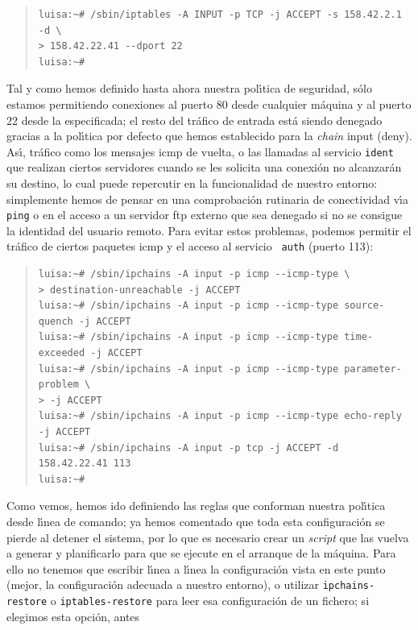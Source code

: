 \begin{quote}
\begin{verbatim}
luisa:~# /sbin/iptables -A INPUT -p TCP -j ACCEPT -s 158.42.2.1 -d \
> 158.42.22.41 --dport 22
luisa:~#
\end{verbatim}
\end{quote}
Tal y como hemos definido hasta ahora nuestra pol\'{\i}tica de seguridad, s\'olo
estamos permitiendo conexiones al puerto 80 desde cualquier m\'aquina y al
puerto 22 desde la especificada; el resto del tr\'afico de entrada est\'a siendo
denegado gracias a la pol\'{\i}tica por defecto que hemos establecido para la
{\it chain} input ({\sc deny}). As\'{\i}, tr\'afico como los mensajes {\sc 
icmp} de vuelta, o las llamadas al servicio {\tt ident} que realizan ciertos
servidores cuando se les solicita una conexi\'on no alcanzar\'an su destino, lo
cual puede repercutir en la funcionalidad de nuestro entorno: simplemente hemos
de pensar en una comprobaci\'on rutinaria de conectividad v\'{\i}a {\tt ping} o
en el acceso a un servidor {\sc ftp} externo que sea denegado si no se consigue 
la identidad del usuario remoto. Para evitar estos problemas, podemos permitir
el tr\'afico de ciertos paquetes {\sc icmp} y el acceso al servicio {\tt
auth} (puerto 113):
\begin{quote}
\begin{verbatim}
luisa:~# /sbin/ipchains -A input -p icmp --icmp-type \ 
> destination-unreachable -j ACCEPT
luisa:~# /sbin/ipchains -A input -p icmp --icmp-type source-quench -j ACCEPT
luisa:~# /sbin/ipchains -A input -p icmp --icmp-type time-exceeded -j ACCEPT
luisa:~# /sbin/ipchains -A input -p icmp --icmp-type parameter-problem \
> -j ACCEPT
luisa:~# /sbin/ipchains -A input -p icmp --icmp-type echo-reply -j ACCEPT
luisa:~# /sbin/ipchains -A input -p tcp -j ACCEPT -d 158.42.22.41 113
luisa:~# 
\end{verbatim}
\end{quote}
Como vemos, hemos ido definiendo las reglas que conforman nuestra pol\'{\i}tica
desde l\'{\i}nea de comando; ya hemos comentado que toda esta configuraci\'on
se pierde al detener el sistema, por lo que es necesario crear un {\it script}
que las vuelva a generar y planificarlo para que se ejecute en el arranque de
la m\'aquina. Para ello no tenemos que escribir l\'{\i}nea a l\'{\i}nea la
configuraci\'on vista en este punto (mejor, la configuraci\'on adecuada a
nuestro entorno), o utilizar {\tt ipchains-restore} o {\tt iptables-restore}
para leer esa configuraci\'on de un fichero; si elegimos esta opci\'on, antes
